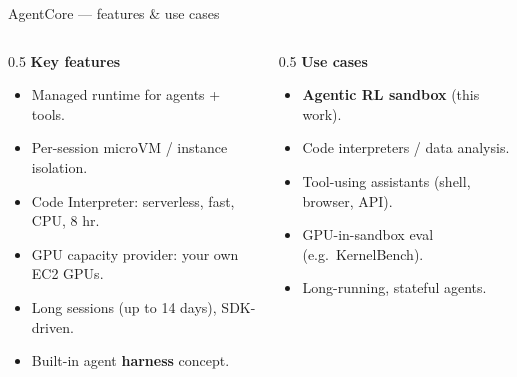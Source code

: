 \documentclass[aspectratio=169]{beamer}
\begin{document}
\begin{frame}{AgentCore --- features \& use cases}
  \begin{columns}[T]
    \begin{column}{0.5\textwidth}
      \textbf{Key features}
      \begin{itemize}\setlength\itemsep{0.2em}
        \item Managed runtime for agents + tools.
        \item Per-session microVM / instance isolation.
        \item Code Interpreter: serverless, fast, CPU, 8 hr.
        \item GPU capacity provider: your own EC2 GPUs.
        \item Long sessions (up to 14 days), SDK-driven.
        \item Built-in agent \textbf{harness} concept.
      \end{itemize}
    \end{column}
    \begin{column}{0.5\textwidth}
      \textbf{Use cases}
      \begin{itemize}\setlength\itemsep{0.2em}
        \item \textbf{Agentic RL sandbox} (this work).
        \item Code interpreters / data analysis.
        \item Tool-using assistants (shell, browser, API).
        \item GPU-in-sandbox eval (e.g.\ KernelBench).
        \item Long-running, stateful agents.
      \end{itemize}
    \end{column}
  \end{columns}
\end{frame}
\end{document}

